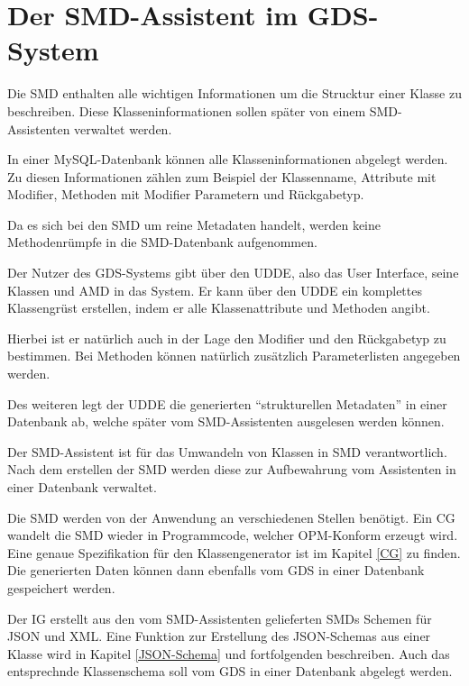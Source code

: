 \section{Der SMD-Assistent im GDS-System} \label{SMD-Assistent}
Die \ac{SMD} enthalten alle wichtigen Informationen um die Strucktur einer Klasse zu beschreiben. Diese Klasseninformationen sollen sp\"ater von einem SMD-Assistenten verwaltet werden.

In einer MySQL-Datenbank k\"onnen alle Klasseninformationen abgelegt werden. Zu diesen Informationen z\"ahlen zum Beispiel der Klassenname, Attribute mit Modifier, Methoden mit Modifier Parametern und R\"uckgabetyp. 

Da es sich bei den \ac{SMD} um reine Metadaten handelt, werden keine Methodenr\"umpfe in die \ac{SMD}-Datenbank aufgenommen.

Der Nutzer des \ac{GDS}-Systems gibt \"uber den \ac{UDDE}, also das User Interface, seine Klassen und \ac{AMD} in das System. Er kann \"uber den \ac{UDDE} ein komplettes Klassengr\"ust erstellen, indem er alle Klassenattribute und Methoden angibt. 

Hierbei ist er nat\"urlich auch in der Lage den Modifier und den R\"uckgabetyp zu bestimmen. Bei Methoden k\"onnen nat\"urlich zus\"atzlich Parameterlisten angegeben werden.

Des weiteren legt der \ac{UDDE} die generierten "`strukturellen Metadaten"' in einer Datenbank ab, welche sp\"ater vom SMD-Assistenten ausgelesen werden k\"onnen.

Der SMD-Assistent ist f\"ur das Umwandeln von Klassen in \ac{SMD} verantwortlich. Nach dem erstellen der \ac{SMD} werden diese zur Aufbewahrung vom Assistenten in einer Datenbank verwaltet.

Die \ac{SMD} werden von der Anwendung an verschiedenen Stellen ben\"otigt. Ein \ac{CG} wandelt die \ac{SMD} wieder in Programmcode, welcher OPM-Konform erzeugt wird. Eine genaue Spezifikation f\"ur den Klassengenerator ist im Kapitel \ref{CG} zu finden.
Die generierten Daten k\"onnen dann ebenfalls vom \ac{GDS} in einer Datenbank gespeichert werden.

Der \ac{IG} erstellt aus den vom SMD-Assistenten gelieferten \ac{SMD}s Schemen f\"ur JSON und XML. Eine Funktion zur Erstellung des JSON-Schemas aus einer Klasse wird in Kapitel \ref{JSON-Schema} und fortfolgenden beschreiben.
Auch das entsprechnde Klassenschema soll vom \ac{GDS} in einer Datenbank abgelegt werden.

